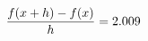 \documentclass[preview]{standalone}
\begin{document}
\begin{align*}
\special{dvisvgm:raw <g id='unique000'>}\frac{f(x+h)-f(x)}{h} = 2.009\special{dvisvgm:raw </g>}
\end{align*}
\end{document}
